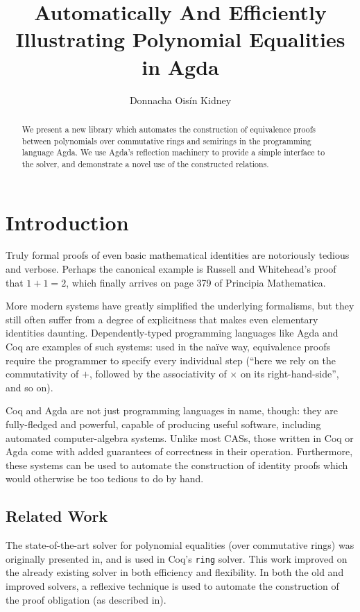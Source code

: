 \documentclass[draft, twocolumn]{article}
\author{Donnacha Oisín Kidney}
\title{Automatically And Efficiently Illustrating Polynomial Equalities in Agda}
\theoremstyle{definition}
\theoremstyle{definition}
\begin{document}
\maketitle
\begin{abstract}
  We present a new library which automates the construction of equivalence
  proofs between polynomials over commutative rings and semirings in the
  programming language Agda\cite{norell_dependently_2008}. We use Agda's
  reflection machinery to provide a simple interface to the solver, and
  demonstrate a novel use of the constructed relations.
\end{abstract}
\tableofcontents
\section{Introduction}
Truly formal proofs of even basic mathematical identities are notoriously
tedious and verbose. Perhaps the canonical example is Russell and Whitehead's
proof that \(1+1=2\), which finally arrives on page 379 of Principia
Mathematica\cite{whitehead_principia_1910}. 

More modern systems have greatly simplified the underlying formalisms, but they
still often suffer from a degree of explicitness that makes even elementary
identities daunting. Dependently-typed programming languages like
Agda\cite{norell_dependently_2008} and
Coq\cite{the_coq_development_team_2018_1219885} are examples of such systems:
used in the naïve way, equivalence proofs require the programmer to specify
every individual step (``here we rely on the commutativity of \(+\), followed by
the associativity of \(\times\) on its right-hand-side'', and so on).

Coq and Agda are not just programming languages in name, though: they are
fully-fledged and powerful, capable of producing useful software, including
automated computer-algebra systems. Unlike most CASs, those written in Coq or
Agda come with added guarantees of correctness in their operation. Furthermore,
these systems can be used to automate the construction of identity proofs which
would otherwise be too tedious to do by hand.
\subsection{Related Work}
The state-of-the-art solver for polynomial equalities (over commutative rings)
was originally presented in\cite{gregoire_proving_2005}, and is used in Coq's
\verb+ring+ solver. This work improved on the already existing
solver\cite{Coq:manual} in both efficiency and flexibility. In both the old and
improved solvers, a reflexive technique is used to automate the construction of
the proof obligation (as described in\cite{boutin_using_1997}).
\end{document}

